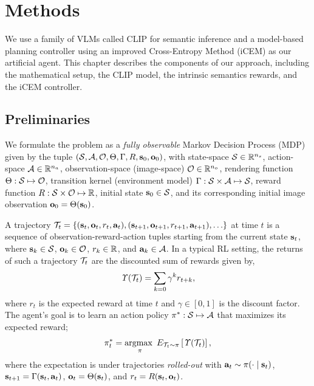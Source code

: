 \chapter{Methods}
\label{sec:methods}

We use a family of VLMs called CLIP \citep{clip} for semantic inference and a model-based planning controller using an improved Cross-Entropy Method (iCEM) \citep{icem} as our artificial agent.
This chapter describes the components of our approach, including the mathematical setup, the CLIP model, the intrinsic semantics rewards, and the iCEM controller.

\section{Preliminaries}
\label{sec:preliminaries}
We formulate the problem as a \emph{fully observable} Markov Decision Process (MDP) given by the tuple \((\mathcal{S}, \mathcal{A}, \mathcal{O}, \Theta, \Gamma, R, \mathbf{s}_0, \mathbf{o}_0)\), with state-space \(\mathcal{S} \in \mathbb{R}^{n_s}\), action-space \(\mathcal{A} \in \mathbb{R}^{n_a}\), observation-space (image-space) \(\mathcal{O} \in \mathbb{R}^{n_o}\), rendering function \(\Theta: \mathcal{S} \mapsto \mathcal{O}\), transition kernel (environment model) \(\Gamma: \mathcal{S} \times \mathcal{A} \mapsto \mathcal{S}\), reward function \(R: \mathcal{S} \times \mathcal{O} \mapsto \mathbb{R}\), initial state \(\mathbf{s}_0 \in \mathcal{S}\), and its corresponding initial image observation \(\mathbf{o}_0 = \Theta(\mathbf{s}_0)\).

A trajectory \(\mathcal{T}_t = \{(\mathbf{s}_t, \mathbf{o}_t, r_t, \mathbf{a}_t), (\mathbf{s}_{t+1}, \mathbf{o}_{t+1}, r_{t+1}, \mathbf{a}_{t+1}), \ldots \}\) at time \(t\) is a sequence of observation-reward-action tuples starting from the current state \(\mathbf{s}_t\), where \(\mathbf{s}_k \in \mathcal{S}\), \(\mathbf{o}_k \in \mathcal{O}\), \(r_k \in \mathbb{R}\), and \(\mathbf{a}_k \in \mathcal{A}\).
In a typical RL setting, the returns of such a trajectory \(\mathcal{T}_t\) are the discounted sum of rewards given by,
\begin{equation}
    \label{eq:rl-goal}
    \mathit{\Upsilon}(\mathcal{T}_t) = \sum_{k=0} \gamma^k r_{t+k},
\end{equation}
where \(r_t\) is the expected reward at time \(t\) and \(\gamma \in [0, 1]\) is the discount factor. The agent's goal is to learn an action policy \(\pi^*: \mathcal{S} \mapsto \mathcal{A}\) that maximizes its expected reward;
\begin{equation}
    \label{eq:rl-policy}
    \pi^*_t = \operatorname*{argmax~}_{\pi} E_{\mathcal{T}_t \sim \pi} \left[ \mathit{\Upsilon}(\mathcal{T}_t) \right],
\end{equation}
where the expectation is under trajectories \emph{rolled-out} with \(\mathbf{a}_t \sim \pi(\cdot \mid \mathbf{s}_t)\), \(\mathbf{s}_{t+1} = \Gamma(\mathbf{s}_t, \mathbf{a}_t)\), \(\mathbf{o}_t = \Theta(\mathbf{s}_t)\), and \(r_t = R(\mathbf{s}_t, \mathbf{o}_t)\).

